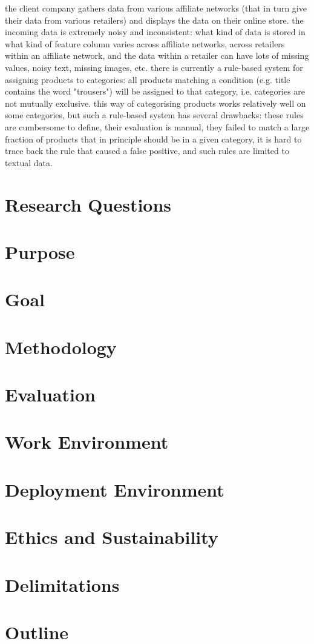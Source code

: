 the client company gathers data from various affiliate networks (that in turn give their data from various retailers) and displays the data on their online store.
the incoming data is extremely noisy and inconsistent: what kind of data is stored in what kind of feature column varies across affiliate networks, across retailers within an affiliate network, and the data within a retailer can have lots of missing values, noisy text, missing images, etc.
there is currently a rule-based system for assigning products to categories: all products matching a condition (e.g. title contains the word "trousers") will be assigned to that category, i.e. categories are not mutually exclusive.
this way of categorising products works relatively well on some categories, but such a rule-based system has several drawbacks: these rules are cumbersome to define, their evaluation is manual, they failed to match a large fraction of products that in principle should be in a given category, it is hard to trace back the rule that caused a false positive, and such rules are limited to textual data.



\section{Research Questions}
\section{Purpose}
\section{Goal}
\section{Methodology}
\section{Evaluation}
\section{Work Environment}
\section{Deployment Environment}
\section{Ethics and Sustainability}
\section{Delimitations}
\section{Outline}
